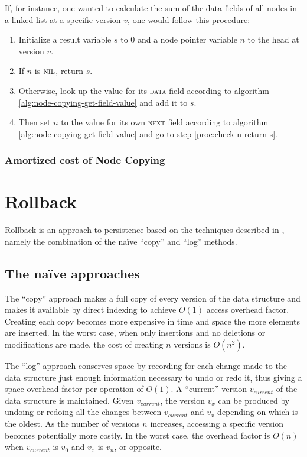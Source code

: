 If, for instance, one wanted to calculate the sum of the data fields of all
nodes in a linked list at a specific version $v$, one would follow this
procedure:

\begin{enumerate}

  \item Initialize a result variable $s$ to 0 and a node pointer variable $n$ to
  the head at version $v$.

  \item If $n$ is $\textsc{nil}$, return $s$.\label{proc:check-n-return-s}
  
  \item Otherwise, look up the value for its \textsc{data} field according to
  algorithm \ref{alg:node-copying-get-field-value} and add it to $s$.
  
  \item Then set $n$ to the value for its own \textsc{next} field according to
  algorithm \ref{alg:node-copying-get-field-value} and go to step
  \ref{proc:check-n-return-s}.

\end{enumerate}

\subsubsection{Amortized cost of Node Copying}

\section{Rollback}
Rollback is an approach to persistence based on the techniques described in
\cite{Tsotras1995237}, namely the combination of the na\"ive ``copy'' and
``log'' methods.

\subsection{The na\"ive approaches}
The ``copy'' approach makes a full copy of every version of the data structure
and makes it available by direct indexing to achieve $O(1)$ access overhead
factor. Creating each copy becomes more expensive in time and space the more
elements are inserted. In the worst case, when only insertions and no deletions
or modifications are made, the cost of creating $n$ versions is
$O\left(n^2\right)$.

The ``log'' approach conserves space by recording for each change made to the
data structure just enough information necessary to undo or redo it, thus giving
a space overhead factor per operation of $O(1)$. A ``current'' version
$v_{current}$ of the data structure is maintained. Given $v_{current}$, the
version $v_x$ can be produced by undoing or redoing all the changes between
$v_{current}$ and $v_x$ depending on which is the oldest. As the number of
versions $n$ increases, accessing a specific version becomes potentially more
costly. In the worst case, the overhead factor is $O(n)$ when $v_{current}$ is
$v_0$ and $v_x$ is $v_n$, or opposite.

